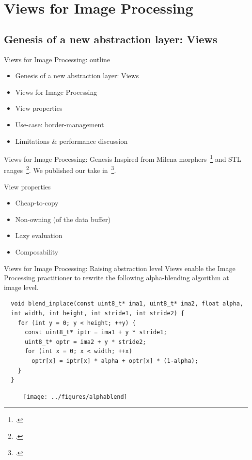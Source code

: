 \documentclass[12pt,aspectratio=169]{beamer}
\begin{document}
%
%
%
\section[Views for Image Processing]{Views for Image Processing}

\subsection{Genesis of a new abstraction layer: Views}

\begin{frame}[fragile]{Views for Image Processing: outline}
  \begin{itemize}
    \item Genesis of a new abstraction layer: Views
    \item Views for Image Processing
    \item View properties
    \item Use-case: border-management
    \item Limitations \& performance discussion
  \end{itemize}
\end{frame}

\begin{frame}[fragile]{Views for Image Processing: Genesis}
  Inspired from Milena morphers~\footcite{levillain.2009.ismm} and STL ranges~\footcite{niebler.2014.ranges}.
  We published our take in~\footcite[]{roynard.2022.gpce}.
  \begin{alertblock}{View properties}
    \begin{itemize}
      \item Cheap-to-copy
      \item Non-owning (of the data buffer)
      \item Lazy evaluation
      \item Composability
    \end{itemize}
  \end{alertblock}
\end{frame}

\begin{frame}[fragile]{Views for Image Processing: Raising abstraction level}
  Views enable the Image Processing practitioner to rewrite the following alpha-blending algorithm at image level.
  \begin{verbatim}
  void blend_inplace(const uint8_t* ima1, uint8_t* ima2, float alpha,
  int width, int height, int stride1, int stride2) {
    for (int y = 0; y < height; ++y) {
      const uint8_t* iptr = ima1 + y * stride1;
      uint8_t* optr = ima2 + y * stride2;
      for (int x = 0; x < width; ++x)
        optr[x] = iptr[x] * alpha + optr[x] * (1-alpha);
    }
  }
  \end{verbatim}
  \centering
  \begin{figure}
    \texttt{[image: ../figures/alphablend]}
  \end{figure}
\end{frame}
\end{document}
